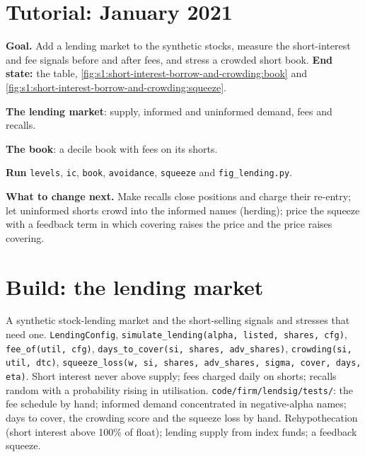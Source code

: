 \section{Tutorial: January 2021}\label{tut:s1:short-interest-borrow-and-crowding:tut}

\begin{tutorial}
\textbf{Goal.} Add a lending market to the synthetic stocks, measure the short-interest and fee signals before and after fees, and stress a crowded short
book. \textbf{End state:} the table, \cref{fig:s1:short-interest-borrow-and-crowding:book} and \cref{fig:s1:short-interest-borrow-and-crowding:squeeze}.
\begin{tutsteps}
\item \textbf{The lending market}: supply, informed and uninformed demand, fees and recalls.
\label{lst:s1:short-interest-borrow-and-crowding:lending}
\item \textbf{The book}: a decile book with fees on its shorts.
\label{lst:s1:short-interest-borrow-and-crowding:book}
\item \textbf{Run} \texttt{levels}, \texttt{ic}, \texttt{book}, \texttt{avoidance}, \texttt{squeeze} and \texttt{fig\_lending.py}.
\end{tutsteps}
\textbf{What to change next.} Make recalls close positions and charge their re-entry; let uninformed shorts crowd into the informed names (herding); price
the squeeze with a feedback term in which covering raises the price and the price raises covering.
\end{tutorial}

\section{Build: the lending market}\label{bld:s1:short-interest-borrow-and-crowding:lendsig}

\begin{build}
 A synthetic stock-lending market and the short-selling signals and stresses that need one.
 \texttt{LendingConfig}, \texttt{simulate\_lending(alpha, listed, shares, cfg)}, \texttt{fee\_of(util, cfg)}, \texttt{days\_to\_cover(si,
shares, adv\_shares)}, \texttt{crowding(si, util, dtc)}, \texttt{squeeze\_loss(w, si, shares, adv\_shares, sigma, cover, days, eta)}.
 Short interest never above supply; fees charged daily on shorts; recalls random with a probability rising in utilisation.
 \texttt{code/firm/lendsig/tests/}: the fee schedule by hand; informed demand concentrated in negative-alpha names; days to cover,
the crowding score and the squeeze loss by hand.
 Rehypothecation (short interest above 100\% of float); lending supply from index funds; a feedback squeeze.
\end{build}


